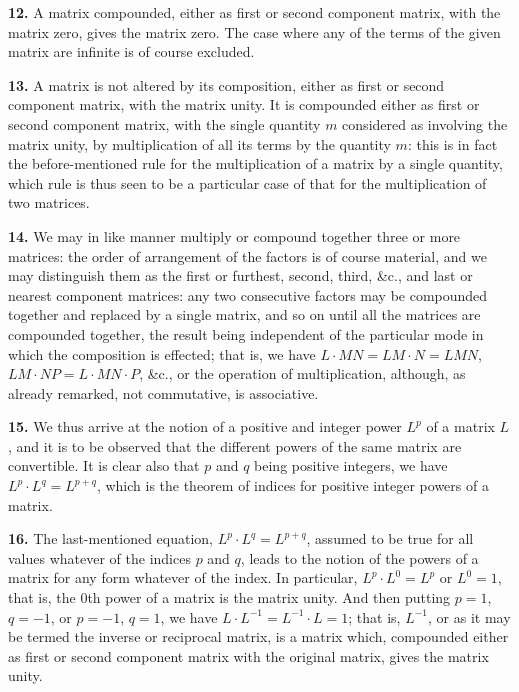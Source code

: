 \documentclass[12pt,a4paper]{article}
\theoremstyle{definition}
\begin{document}
\medskip
\noindent\textbf{12.} A matrix compounded, either as first or second component matrix, with the matrix zero, gives the matrix zero. The case where any of the terms of the given matrix are infinite is of course excluded.

\medskip
\noindent\textbf{13.} A matrix is not altered by its composition, either as first or second component matrix, with the matrix unity. It is compounded either as first or second component matrix, with the single quantity $m$ considered as involving the matrix unity, by multiplication of all its terms by the quantity $m$: this is in fact the before-mentioned rule for the multiplication of a matrix by a single quantity, which rule is thus seen to be a particular case of that for the multiplication of two matrices.

\medskip
\noindent\textbf{14.} We may in like manner multiply or compound together three or more matrices: the order of arrangement of the factors is of course material, and we may distinguish them as the first or furthest, second, third, \&c., and last or nearest component matrices: any two consecutive factors may be compounded together and replaced by a single matrix, and so on until all the matrices are compounded together, the result being independent of the particular mode in which the composition is effected; that is, we have $L \cdot MN = LM \cdot N = LMN$, $LM \cdot NP = L \cdot MN \cdot P$, \&c., or the operation of multiplication, although, as already remarked, not commutative, is associative.

\medskip
\noindent\textbf{15.} We thus arrive at the notion of a positive and integer power $L^p$ of a matrix $L$, and it is to be observed that the different powers of the same matrix are convertible. It is clear also that $p$ and $q$ being positive integers, we have $L^p \cdot L^q = L^{p+q}$, which is the theorem of indices for positive integer powers of a matrix.

\medskip
\noindent\textbf{16.} The last-mentioned equation, $L^p \cdot L^q = L^{p+q}$, assumed to be true for all values whatever of the indices $p$ and $q$, leads to the notion of the powers of a matrix for any form whatever of the index. In particular, $L^p \cdot L^0 = L^p$ or $L^0 = 1$, that is, the $0$th power of a matrix is the matrix unity. And then putting $p=1$, $q=-1$, or $p=-1$, $q=1$, we have $L \cdot L^{-1} = L^{-1} \cdot L = 1$; that is, $L^{-1}$, or as it may be termed the inverse or reciprocal matrix, is a matrix which, compounded either as first or second component matrix with the original matrix, gives the matrix unity.
\end{document}
